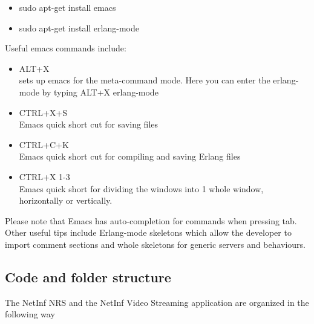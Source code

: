 \begin{itemize}
\item sudo apt-get install emacs
\item sudo apt-get install erlang-mode
\end{itemize}

Useful emacs commands include:

\begin{itemize}
\item ALT+X \\
sets up emacs for the meta-command mode. Here you can enter the erlang-mode by typing
ALT+X erlang-mode
\item CTRL+X+S \\
Emacs quick short cut for saving files
\item CTRL+C+K \\
Emacs quick short cut for compiling and saving Erlang files
\item CTRL+X 1-3 \\
Emacs quick short for dividing the windows into 1 whole window, horizontally or vertically.
\end{itemize}

Please note that Emacs has auto-completion for commands when pressing tab. Other useful tips include Erlang-mode skeletons which allow the developer to import comment sections and whole skeletons for generic servers and behaviours.

\subsection {Code and folder structure}

The NetInf NRS and the NetInf Video Streaming application are organized in the following way

